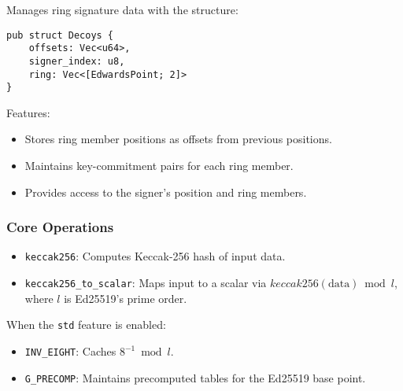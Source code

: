 Manages ring signature data with the structure: %

\begin{verbatim}
pub struct Decoys {
    offsets: Vec<u64>,
    signer_index: u8,
    ring: Vec<[EdwardsPoint; 2]>
}
\end{verbatim}

Features:
\begin{itemize}
  \item Stores ring member positions as offsets from previous positions.  %
  \item Maintains key-commitment pairs for each ring member.  %
  \item Provides access to the signer's position and ring members. %
\end{itemize}

\subsubsection{Core Operations}


\begin{itemize}
  \item \texttt{keccak256}: Computes Keccak-256 hash of input data.  %
  \item \texttt{keccak256\_to\_scalar}: Maps input to a scalar via $keccak256(\text{data}) \bmod l$, where $l$ is Ed25519's prime order. %
\end{itemize}

When the \texttt{std} feature is enabled:
\begin{itemize}
  \item \texttt{INV\_EIGHT}: Caches $8^{-1} \bmod l$.  %
  \item \texttt{G\_PRECOMP}: Maintains precomputed tables for the Ed25519 base point. %
\end{itemize}

